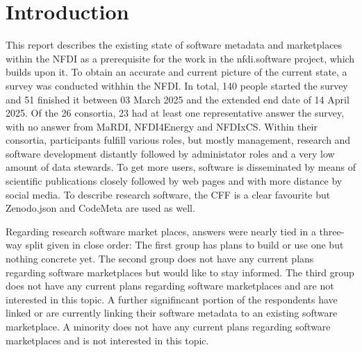 \documentclass[headsepline,titlepage,twoside,12pt,toc=flat,headings=normal]{scrreprt}
\author{\theauthor}
\date{\thedate}
\title{\thetitle}
\subtitle{Deliverable 2.2}
\begin{document}

\maketitle
\imprint

\chapter*{Introduction}\label{ch:introduction}

This report describes the existing state of software metadata and marketplaces within the NFDI as a prerequisite for the work in the nfdi.software project, which builds upon it.
To obtain an accurate and current picture of the current state, a survey was conducted withhin the NFDI.
In total, 140 people started the survey and 51 finished it between 03 March 2025 and the extended end date of 14 April 2025.
Of the 26 consortia, 23 had at least one representative answer the survey, with no answer from MaRDI, NFDI4Energy and NFDIxCS.
Within their consortia, participants fulfill various roles, but mostly management, research and software development distantly followed by administator roles and a very low amount of data stewards.
To get more users, software is disseminated by means of scientific publications closely followed by web pages and with more distance by social media.
To describe research software, the \acf{CFF} is a clear favourite but Zenodo.json and CodeMeta are used as well.

Regarding research software market places, answers were nearly tied in a three-way split given in close order:
The first group has plans to build or use one but nothing concrete yet.
The second group does not have any current plans regarding software marketplaces but would like to stay informed.
The third group does not have any current plans regarding software marketplaces and are not interested in this topic.
A further signifincant portion of the respondents have linked or are currently linking their software metadata to an existing software marketplace.
A minority does not have any current plans regarding software marketplaces and is not interested in this topic.
\end{document}
